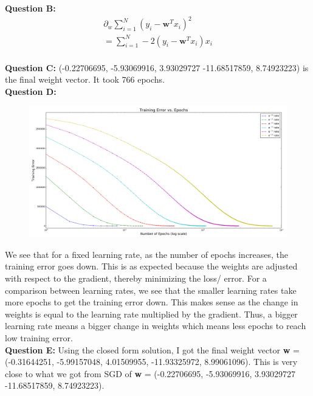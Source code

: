 \documentclass[12 pt]{article}
\begin{document}
	\noindent\textbf{Question B:} \\

	\begin{eqnarray*}
		\partial_w \sum_{i=1}^{N} {(y_i - \textbf{w}^Tx_i)}^2 \\
		= \sum_{i=1}^{N} -2(y_i - \textbf{w}^Tx_i) x_i\\
	\end{eqnarray*} 
	
	\noindent\textbf{Question C: }(-0.22706695, -5.93069916, 3.93029727 -11.68517859, 8.74923223) is the final weight vector. It took 766 epochs. \\
	
	\noindent\textbf{Question D:} 
		\begin{figure}[H]
			\includegraphics[width=17cm]{TrainingErrorEpochs}
		\end{figure} 
		
		\noindent We see that for a fixed learning rate, as the number of epochs increases, the training error goes down. This is as expected because the weights are adjusted with respect to the gradient, thereby minimizing the loss/ error. For a comparison between learning rates, we see that the smaller learning rates take more epochs to get the training error down. This makes sense as the change in weights is equal to the learning rate multiplied by the gradient. Thus, a bigger learning rate means a bigger change in weights which means less epochs to reach low training error. \\

	\noindent\textbf{Question E:} Using the closed form solution, I got the final weight vector \textbf{w} = (-0.31644251, -5.99157048, 4.01509955, -11.93325972, 8.99061096). This is very close to what we got from SGD of \textbf{w} = (-0.22706695, -5.93069916, 3.93029727 -11.68517859, 8.74923223). \\
	
\end{document}
